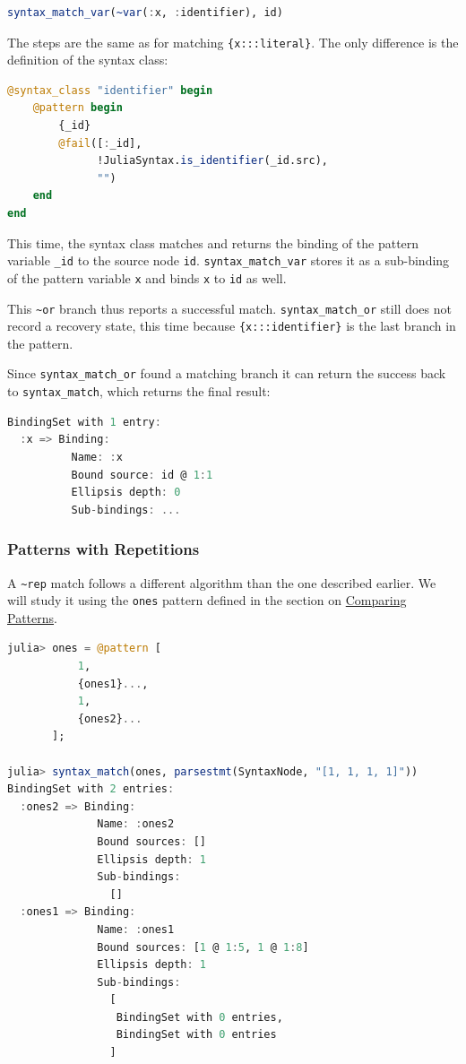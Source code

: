 \documentclass{juliacon}
\begin{document}
\begin{lstlisting}[language=julia]
syntax_match_var(~var(:x, :identifier), id)
\end{lstlisting}

The steps are the same as for matching \texttt{\{x:::literal\}}. The only
difference is the definition of the syntax class:

\begin{lstlisting}[language=julia]
@syntax_class "identifier" begin
    @pattern begin
        {_id}
        @fail([:_id],
              !JuliaSyntax.is_identifier(_id.src),
              "")
    end
end
\end{lstlisting}

This time, the syntax class matches and returns the binding of the
pattern variable \texttt{\_id} to the source node \texttt{id}. \texttt{syntax\_match\_var}
stores it as a sub-binding of the pattern variable \texttt{x} and binds \texttt{x}
to \texttt{id} as well.

This \texttt{\textasciitilde{}or} branch thus reports a successful match. \texttt{syntax\_match\_or}
still does not record a recovery state, this time because
\texttt{\{x:::identifier\}} is the last branch in the pattern.

Since \texttt{syntax\_match\_or} found a matching branch it can return the
success back to \texttt{syntax\_match}, which returns the final result:

\begin{lstlisting}[language=julia]
BindingSet with 1 entry:
  :x => Binding:
          Name: :x
          Bound source: id @ 1:1
          Ellipsis depth: 0
          Sub-bindings: ...
\end{lstlisting}

\subsubsection{Patterns with Repetitions}
\label{sec:orgdac9357}

A \texttt{\textasciitilde{}rep} match follows a different algorithm than the one described
earlier. We will study it using the \texttt{ones} pattern defined in the
section on \hyperref[org718abd6]{Comparing Patterns}.

\begin{lstlisting}[language=julia]
julia> ones = @pattern [
           1,
           {ones1}...,
           1,
           {ones2}...
       ];

julia> syntax_match(ones, parsestmt(SyntaxNode, "[1, 1, 1, 1]"))
BindingSet with 2 entries:
  :ones2 => Binding:
              Name: :ones2
              Bound sources: []
              Ellipsis depth: 1
              Sub-bindings:
                []
  :ones1 => Binding:
              Name: :ones1
              Bound sources: [1 @ 1:5, 1 @ 1:8]
              Ellipsis depth: 1
              Sub-bindings:
                [
                 BindingSet with 0 entries,
                 BindingSet with 0 entries
                ]
\end{lstlisting}
\end{document}
